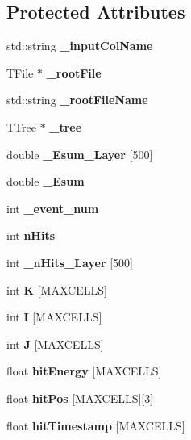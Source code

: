 \subsection*{Protected Attributes}
\begin{DoxyCompactItemize}
\item 
std::string {\bfseries \_\-inputColName}\label{classCALICE_1_1RootTreeGenerator2_a6d97d1cb478d4b9f9ad07d9f931d85c3}

\item 
TFile $\ast$ {\bfseries \_\-rootFile}\label{classCALICE_1_1RootTreeGenerator2_a08632a2ad60e68621fcb6057e30a4eac}

\item 
std::string {\bfseries \_\-rootFileName}\label{classCALICE_1_1RootTreeGenerator2_ab7abbc742f5582e197cef4f90d7eb36b}

\item 
TTree $\ast$ {\bfseries \_\-tree}\label{classCALICE_1_1RootTreeGenerator2_aa67a509d3dab33a262220f7a75142b24}

\item 
double {\bfseries \_\-Esum\_\-Layer} [500]\label{classCALICE_1_1RootTreeGenerator2_aedb545467debf9bbe2d804c563cc801c}

\item 
double {\bfseries \_\-Esum}\label{classCALICE_1_1RootTreeGenerator2_a1ca6108c11d35a075c8e4b5c73ec47a6}

\item 
int {\bfseries \_\-event\_\-num}\label{classCALICE_1_1RootTreeGenerator2_a4e67941217c6c2c47667ab4e8704205e}

\item 
int {\bfseries nHits}\label{classCALICE_1_1RootTreeGenerator2_afa5acbbee145772c75b2827d22a65215}

\item 
int {\bfseries \_\-nHits\_\-Layer} [500]\label{classCALICE_1_1RootTreeGenerator2_aba262ed115b31d6232e74d4e0cf1ab11}

\item 
int {\bfseries K} [MAXCELLS]\label{classCALICE_1_1RootTreeGenerator2_a342a74fb9c58d7979f235fdfa397810b}

\item 
int {\bfseries I} [MAXCELLS]\label{classCALICE_1_1RootTreeGenerator2_adf394c456c8c971690e5527cbb28b489}

\item 
int {\bfseries J} [MAXCELLS]\label{classCALICE_1_1RootTreeGenerator2_a8ae43ce288d7ca3c0ba9ec24ce1c7423}

\item 
float {\bfseries hitEnergy} [MAXCELLS]\label{classCALICE_1_1RootTreeGenerator2_af193968dbbbced70a48cb8c91542b63b}

\item 
float {\bfseries hitPos} [MAXCELLS][3]\label{classCALICE_1_1RootTreeGenerator2_a4643eefe73766b7c5f7a07fcd774dd3e}

\item 
float {\bfseries hitTimestamp} [MAXCELLS]\label{classCALICE_1_1RootTreeGenerator2_a3b0120528cb9709ead78bf63759d843c}

\end{DoxyCompactItemize}



